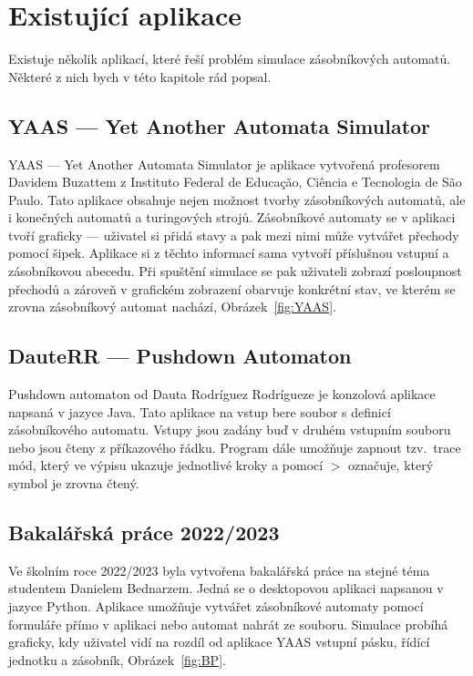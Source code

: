 \chapter{Existující aplikace}\label{chap:ExistingApps}

Existuje několik aplikací, které řeší problém simulace zásobníkových automatů. Některé z nich bych v této kapitole rád popsal.~\cite{Buzatto2023}~\cite{Rodriguez2018}~\cite{Bednarz2023}

\section{YAAS --- Yet Another Automata Simulator}

YAAS --- Yet Another Automata Simulator je aplikace vytvořená profesorem Davidem Buzattem z Instituto Federal de Educação, Ciência e Tecnologia de São Paulo. Tato aplikace obsahuje nejen možnost tvorby zásobníkových automatů, ale i konečných automatů a turingových strojů. Zásobníkové automaty se v aplikaci tvoří graficky --- uživatel si přidá stavy a pak mezi nimi může vytvářet přechody pomocí šipek. Aplikace si z těchto informací sama vytvoří příslušnou vstupní a zásobníkovou abecedu. Při spuštění simulace se pak uživateli zobrazí posloupnost přechodů a zároveň v grafickém zobrazení obarvuje konkrétní stav, ve kterém se zrovna zásobníkový automat nachází, Obrázek~\ref{fig:YAAS}.

\section{DauteRR --- Pushdown Automaton}

Pushdown automaton od Dauta Rodríguez Rodrígueze je konzolová aplikace napsaná v jazyce Java. Tato aplikace na vstup bere soubor s definicí zásobníkového automatu. Vstupy jsou zadány buď v druhém vstupním souboru nebo jsou čteny z příkazového řádku. Program dále umožňuje zapnout tzv.~trace mód, který ve výpisu ukazuje jednotlivé kroky a pomocí $>$ označuje, který symbol je zrovna čtený.

\section{Bakalářská práce 2022/2023}

Ve školním roce 2022/2023 byla vytvořena bakalářská práce na stejné téma studentem Danielem Bednarzem. Jedná se o desktopovou aplikaci napsanou v jazyce Python. Aplikace umožňuje vytvářet zásobníkové automaty pomocí formuláře přímo v aplikaci nebo automat nahrát ze souboru. Simulace probíhá graficky, kdy uživatel vidí na rozdíl od aplikace YAAS vstupní pásku, řídící jednotku a zásobník, Obrázek~\ref{fig:BP}.

